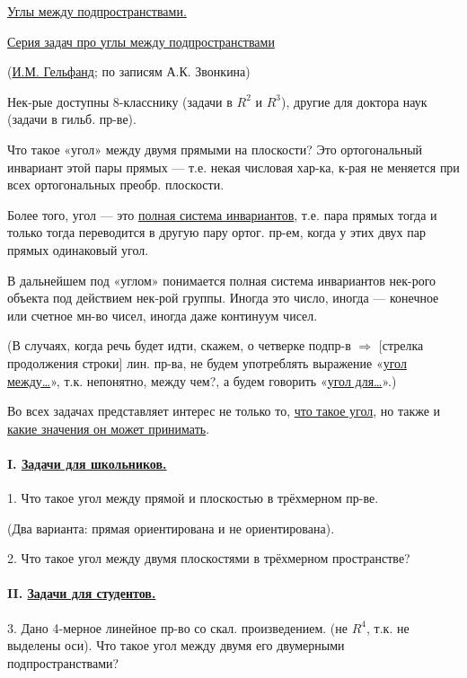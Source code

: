 \underline{Углы между подпространствами.}

\begin{center}
\underline{Серия задач про углы между подпространствами}

(\underline{И.М. Гельфанд}; по записям А.К. Звонкина)
\end{center}

Нек-рые доступны 8-класснику (задачи в $R^2$ и $R^3$),
другие для доктора наук (задачи в гильб. пр-ве).

Что такое «угол» между двумя прямыми на плоскости?
Это ортогональный инвариант этой пары прямых — т.е. некая
числовая хар-ка, к-рая не меняется при всех ортогональных преобр.
плоскости.

Более того, угол — это \underline{полная система инвариантов}, т.е.
пара прямых тогда и только тогда переводится в другую пару
ортог. пр-ем, когда у этих двух пар прямых одинаковый угол.

В дальнейшем под «углом» понимается полная система
инвариантов нек-рого объекта под действием нек-рой группы.
Иногда это число, иногда — конечное или счетное мн-во чисел,
иногда даже континуум чисел.

(В случаях, когда речь будет идти, скажем, о четверке подпр-в
$\Rightarrow$ [стрелка продолжения строки]
лин. пр-ва, не будем употреблять выражение «\underline{угол между\ldots}»,
т.к. непонятно, между чем?, а будем говорить «\underline{угол для\ldots}».)

Во всех задачах представляет интерес не только то,
\underline{что такое угол}, но также и \underline{какие значения он может
принимать}.

\paragraph*{I. \underline{Задачи для школьников.}}
1. Что такое угол между прямой и плоскостью в трёхмерном
пр-ве.

(Два варианта: прямая ориентирована и не ориентирована).

2. Что такое угол между двумя плоскостями в трёхмерном
пространстве?

\paragraph*{II. \underline{Задачи для студентов.}}
3. Дано 4-мерное линейное пр-во со скал. произведением.
(не $R^4$, т.к. не выделены оси). Что такое угол между двумя его
двумерными подпространствами?

